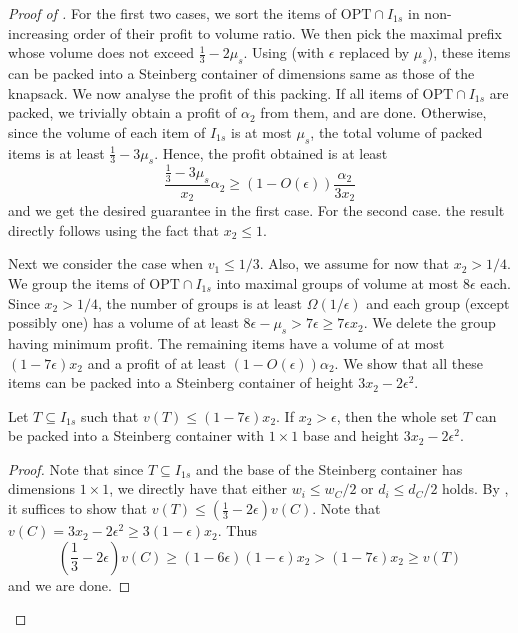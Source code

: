 \iffalse
\begin{proof}[Proof of ]
    For the first two cases, we sort the items of $\text{OPT}\cap I_{1s}$ in non-increasing order of their profit to volume ratio. We then pick the maximal prefix whose volume does not exceed $\frac{1}{3}-2\mu_s$. Using  (with $\epsilon$ replaced by $\mu_s$), these items can be packed into a Steinberg container of dimensions same as those of the knapsack. We now analyse the profit of this packing. If all items of $\text{OPT}\cap I_{1s}$ are packed, we trivially obtain a profit of $\alpha_2$ from them, and are done. Otherwise, since the volume of each item of $I_{1s}$ is at most $\mu_s$, the total volume of packed items is at least $\frac{1}{3}-3\mu_s$. Hence, the profit obtained is at least 
    \[ \frac{\frac{1}{3}-3\mu_s}{x_2}\alpha_2 \ge (1-O(\epsilon))\frac{\alpha_2}{3x_2}\]
    and we get the desired guarantee in the first case. For the second case. the result directly follows using the fact that $x_2 \le 1$.
    
    
    Next we consider the case when $v_1\le 1/3$. Also, we assume for now that $x_2 > 1/4$. We group the items of $\text{OPT}\cap I_{1s}$ into maximal groups of volume at most $8\epsilon$ each. Since $x_2 > 1/4$, the number of groups is at least $\Omega(1/\epsilon)$ and each group (except possibly one) has a volume of at least $8\epsilon-\mu_s>7\epsilon\ge 7\epsilon x_2$. We delete the group having minimum profit. The remaining items have a volume of at most $(1-7\epsilon)x_2$ and a profit of at least $(1-O(\epsilon))\alpha_2$. We show that all these items can be packed into a Steinberg container of height $3x_2-2\epsilon^2$.
    
    \begin{claim}
        Let $T\subseteq I_{1s}$ such that $v(T)\le (1-7\epsilon)x_2$. If $x_2 > \epsilon$, then the whole set $T$ can be packed into a Steinberg container with $1\times 1$ base and height $3x_2-2\epsilon^2$.
    \end{claim}
    \begin{proof}
        Note that since $T\subseteq I_{1s}$ and the base of the Steinberg container has dimensions $1\times 1$, we directly have that either $w_i \le w_C/2$ or $d_i \le d_C/2$ holds. By , it suffices to show that $v(T)\le \left(\frac{1}{3}-2\epsilon\right)v(C)$. Note that $v(C) = 3x_2 - 2\epsilon^2 \ge 3(1-\epsilon)x_2$. Thus
        \[ \left(\frac{1}{3}-2\epsilon\right)v(C) \ge (1-6\epsilon)(1-\epsilon)x_2 > (1-7\epsilon)x_2 \ge v(T)\]
        and we are done.
    \end{proof}


\end{proof}
